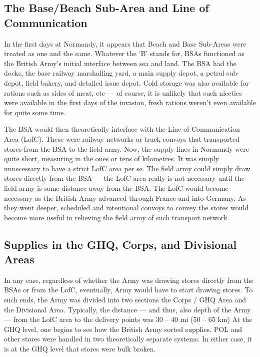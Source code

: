 \documentclass[noraggedright]{turabian-researchpaper}
\begin{document}
\subsection{The Base/Beach Sub-Area and Line of Communication}

In the first days at 
Normandy, it appears that Beach and  Base Sub-Areas were treated as one and
the same.  Whatever the `B' stands for, BSAs functioned as the British Army's
initial interface between sea and land.  The BSA had %
the docks, the base railway marshalling yard, a main supply depot, a petrol
sub-depot, field bakery, and detailed issue depot. Cold storage was also 
available for rations such as sides of meat, etc --- of course, it is unlikely
that such niceties were available in the first days of the invasion, fresh
rations weren't even available for quite some time. %

The BSA would then theoretically interface with the Line of Communication
Area (LofC).  These were railway networks or truck convoys that transported
stores from the BSA to the field army.  Now, the supply lines in Normandy were
quite short, measuring in the ones or tens of kilometres.  It was simply 
unnecessary to have a strict LofC area per se.  The field army could simply
draw stores directly from the BSA --- the LofC area really is not necessary
until the field army is some distance away from the BSA.  The LofC would 
become necessary as the British Army advanced through France and into 
Germany.  As they went deeper, scheduled and intentional convoys to convey
the stores would become more useful in relieving the field army of such 
transport network.  

\subsection{Supplies in the GHQ, Corps, and Divisional Areas}

In any case, regardless of whether the Army was drawing stores directly from 
the BSAs or from the LofC, eventually,  Army would have to start drawing
stores.  To such ends, the Army was divided into two sections the 
Corps / GHQ Area and the Divisional Area.  Typically, the distance --- and 
thus, also depth of the Army --- from the LofC area to the delivery points
was 30 -- 40 mi (50 -- 65 km)  At the GHQ level, one begins to
see how the British Army sorted supplies.  POL and other stores were handled
in two theoretically separate systems.  In either case, it is at the GHQ level
that stores were bulk broken.  
\end{document}
